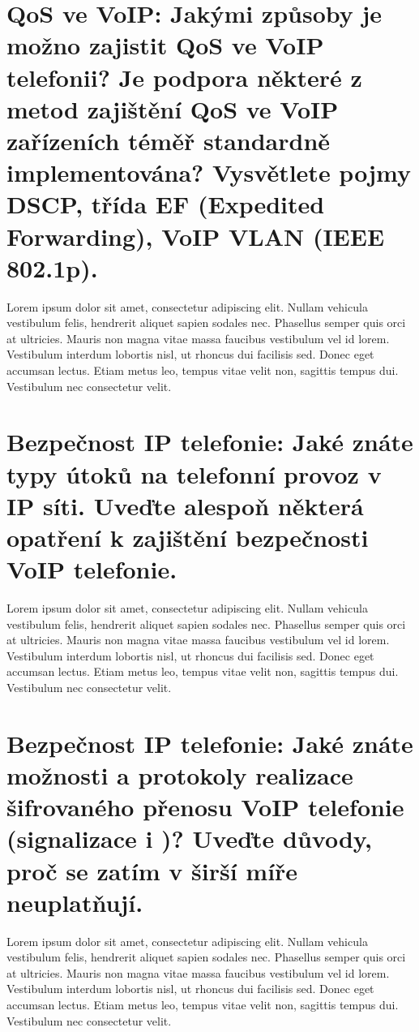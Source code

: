\section{QoS ve VoIP: Jakými způsoby je možno zajistit QoS ve VoIP telefonii? Je podpora některé z metod zajištění QoS ve VoIP zařízeních téměř standardně implementována? Vysvětlete pojmy DSCP, třída EF (Expedited Forwarding), VoIP VLAN (IEEE 802.1p).}

Lorem ipsum dolor sit amet, consectetur adipiscing elit. Nullam vehicula vestibulum felis, hendrerit aliquet sapien sodales nec. Phasellus semper quis orci at ultricies. Mauris non magna vitae massa faucibus vestibulum vel id lorem. Vestibulum interdum lobortis nisl, ut rhoncus dui facilisis sed. Donec eget accumsan lectus. Etiam metus leo, tempus vitae velit non, sagittis tempus dui. Vestibulum nec consectetur velit.

\section{Bezpečnost IP telefonie: Jaké znáte typy útoků na telefonní provoz v IP síti. Uveďte alespoň některá opatření k zajištění bezpečnosti VoIP telefonie.}

Lorem ipsum dolor sit amet, consectetur adipiscing elit. Nullam vehicula vestibulum felis, hendrerit aliquet sapien sodales nec. Phasellus semper quis orci at ultricies. Mauris non magna vitae massa faucibus vestibulum vel id lorem. Vestibulum interdum lobortis nisl, ut rhoncus dui facilisis sed. Donec eget accumsan lectus. Etiam metus leo, tempus vitae velit non, sagittis tempus dui. Vestibulum nec consectetur velit.

\section{Bezpečnost IP telefonie: Jaké znáte možnosti a protokoly realizace šifrovaného přenosu VoIP telefonie (signalizace i )? Uveďte důvody, proč se zatím v širší míře neuplatňují.}

Lorem ipsum dolor sit amet, consectetur adipiscing elit. Nullam vehicula vestibulum felis, hendrerit aliquet sapien sodales nec. Phasellus semper quis orci at ultricies. Mauris non magna vitae massa faucibus vestibulum vel id lorem. Vestibulum interdum lobortis nisl, ut rhoncus dui facilisis sed. Donec eget accumsan lectus. Etiam metus leo, tempus vitae velit non, sagittis tempus dui. Vestibulum nec consectetur velit.

